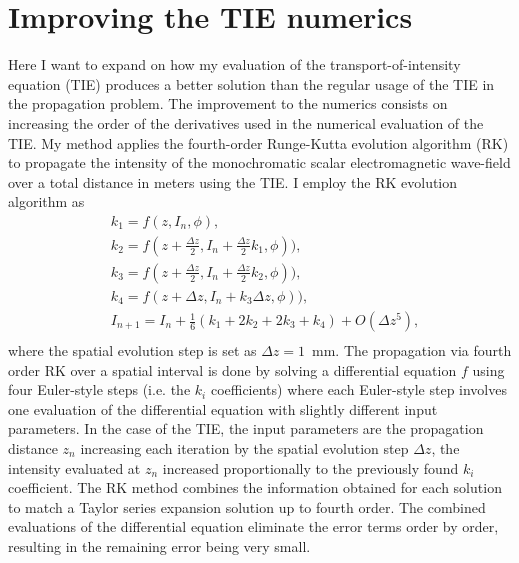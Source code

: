 \documentclass[10pt, a4paper, singlespacing]{report}
\begin{document}
\section{Improving the TIE numerics}\label{TIE+RK}
Here I want to expand on how my evaluation of the transport-of-intensity equation (TIE) produces a better solution than the regular usage of the TIE in the propagation problem.
The improvement to the numerics consists on increasing the order of the derivatives used in the numerical evaluation of the TIE. My method applies the fourth-order Runge-Kutta evolution algorithm (RK) to propagate the intensity of the monochromatic scalar electromagnetic wave-field over a total distance in meters using the TIE. I employ the RK evolution algorithm as
\begin{equation} \label{eq:17}
\begin{split}
&k_1 = f(z, I_n, \phi),\\
&k_2 = f(z + \frac{\Delta z}{2}, I_n + \frac{\Delta z }{2}k_1, \phi)),\\
&k_3 = f(z + \frac{\Delta z}{2}, I_n + \frac{\Delta z }{2}k_2, \phi)),\\
&k_4 = f(z + \Delta z, I_n + k_3 \Delta z, \phi)),\\
&I_{n + 1} = I_{n} + \frac{1}{6}(k_1 + 2k_2 + 2k_3 + k_4) + O(\Delta z^5),\\
\end{split}
\end{equation}
where the spatial evolution step is set as $\Delta z = 1$~mm. The propagation via fourth order RK over a spatial interval is done by solving a differential equation $f$ using four Euler-style steps (i.e. the $k_i$ coefficients) where each Euler-style step involves one evaluation of the differential equation with slightly different input parameters. In the case of the TIE, the input parameters are the propagation distance $z_n$ increasing each iteration by the spatial evolution step $\Delta z$, the intensity evaluated at $z_n$ increased proportionally to the previously found $k_i$ coefficient. The RK method combines the information obtained for each solution to match a Taylor series expansion solution up to fourth order. The combined evaluations of the differential equation eliminate the error terms order by order, resulting in the remaining error being very small\cite{N_R}.

\end{document}
